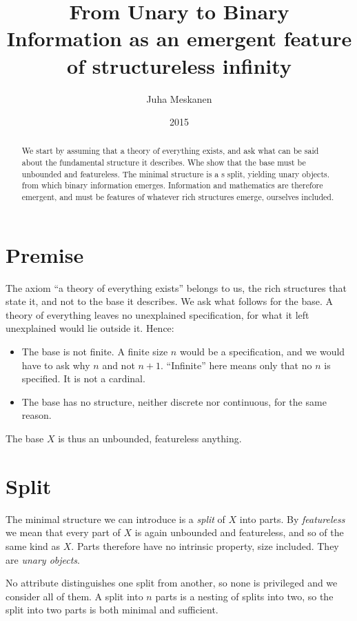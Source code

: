\documentclass[11pt]{article}
\title{From Unary to Binary\\
\large Information as an emergent feature of structureless infinity}
\author{Juha Meskanen}
\date{2015}
\begin{document}
\maketitle

\begin{abstract}
We start by assuming that a theory of
everything exists, and ask what can be said about the fundamental structure
it describes. Whe show that the base must be unbounded and featureless. The minimal
structure is a s split, yielding unary objects.
from which binary information emerges. Information and
mathematics are therefore emergent, and must be features of whatever
rich structures emerge, ourselves included.
\end{abstract}

\section{Premise}
The axiom ``a theory of everything exists'' belongs to us, the rich structures
that state it, and not to the base it describes. We ask what follows for the
base. A theory of everything leaves no unexplained specification, for what it
left unexplained would lie outside it. Hence:
\begin{itemize}
  \item The base is not finite. A finite size $n$ would be a specification, and
        we would have to ask why $n$ and not $n+1$. ``Infinite'' here means only
        that no $n$ is specified. It is not a cardinal.
  \item The base has no structure, neither discrete nor continuous, for the same
        reason.
\end{itemize}
The base $X$ is thus an unbounded, featureless anything.

\section{Split}
The minimal structure we can introduce is a \emph{split} of $X$ into parts. By
\emph{featureless} we mean that every part of $X$ is again unbounded and
featureless, and so of the same kind as $X$. Parts therefore have no intrinsic
property, size included. They are \emph{unary objects}.

No attribute distinguishes one split from another, so none is privileged and we
consider all of them. A split into $n$ parts is a nesting of splits into two, so
the split into two parts is both minimal and sufficient.
\end{document}
